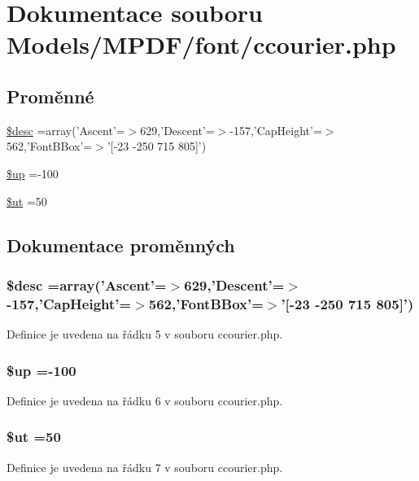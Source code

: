 \hypertarget{ccourier_8php}{\section{Dokumentace souboru Models/\-M\-P\-D\-F/font/ccourier.php}
\label{ccourier_8php}
}
\subsection*{Proměnné}
\begin{DoxyCompactItemize}
\item 
\hyperlink{ccourier_8php_a31059b9e4d0c5af34df20da32232ea9a}{\$desc} =array('Ascent'=$>$629,'Descent'=$>$-\/157,'Cap\-Height'=$>$562,'Font\-B\-Box'=$>$'\mbox{[}-\/23 -\/250 715 805\mbox{]}')
\item 
\hyperlink{ccourier_8php_a6b5ad2ac55f9df46e8f34e78fbd6f176}{\$up} =-\/100
\item 
\hyperlink{ccourier_8php_aadd3f841051043ee58e587e840e8dd0b}{\$ut} =50
\end{DoxyCompactItemize}


\subsection{Dokumentace proměnných}
\hypertarget{ccourier_8php_a31059b9e4d0c5af34df20da32232ea9a}{
\subsubsection[{\$desc}]{\setlength{\rightskip}{0pt plus 5cm}\$desc =array('Ascent'=$>$629,'Descent'=$>$-\/157,'Cap\-Height'=$>$562,'Font\-B\-Box'=$>$'\mbox{[}-\/23 -\/250 715 805\mbox{]}')}}\label{ccourier_8php_a31059b9e4d0c5af34df20da32232ea9a}


Definice je uvedena na řádku 5 v souboru ccourier.\-php.

\hypertarget{ccourier_8php_a6b5ad2ac55f9df46e8f34e78fbd6f176}{
\subsubsection[{\$up}]{\setlength{\rightskip}{0pt plus 5cm}\$up =-\/100}}\label{ccourier_8php_a6b5ad2ac55f9df46e8f34e78fbd6f176}


Definice je uvedena na řádku 6 v souboru ccourier.\-php.

\hypertarget{ccourier_8php_aadd3f841051043ee58e587e840e8dd0b}{
\subsubsection[{\$ut}]{\setlength{\rightskip}{0pt plus 5cm}\$ut =50}}\label{ccourier_8php_aadd3f841051043ee58e587e840e8dd0b}


Definice je uvedena na řádku 7 v souboru ccourier.\-php.

